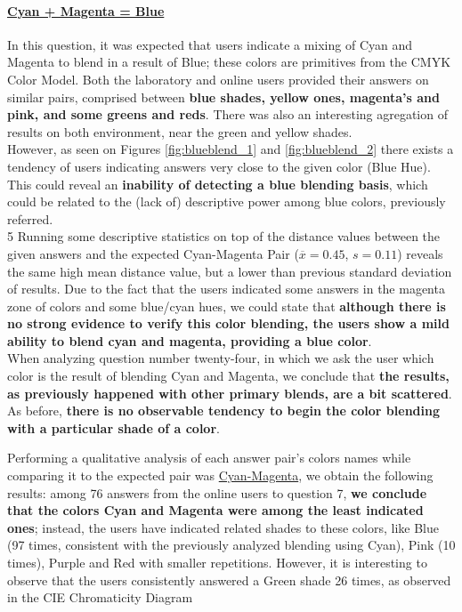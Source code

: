 \paragraph{\ul{Cyan + Magenta = Blue}}
%
In this question, it was expected that users indicate a mixing of Cyan and Magenta to blend in a result of Blue; these colors are primitives from the CMYK Color Model. Both the laboratory and online users provided their answers
on similar pairs, comprised between \textbf{blue shades, yellow ones, magenta's and pink, and some greens and reds}. There was also an interesting agregation of results on both environment, near the green and yellow shades.  \\
%
However, as seen on Figures \ref{fig:blueblend_1} and \ref{fig:blueblend_2} there exists a tendency of users indicating answers very close to the given color (Blue Hue). This could reveal an \textbf{inability of detecting a blue blending
basis}, which could be related to the (lack of) descriptive power among blue colors, previously referred. \\
5
Running some descriptive statistics on top of the distance values between the given answers and the expected Cyan-Magenta Pair ($\overline{x} = 0.45$, $s = 0.11$) reveals the same high mean distance value, but a lower than previous
standard deviation of results. Due to the fact that the users indicated some answers in the magenta zone of colors and some blue/cyan hues, we could state that \textbf{although there is no strong evidence to verify this color blending, the
users show a mild ability to blend cyan and magenta, providing a blue color}. \\
%
When analyzing question number twenty-four, in which we ask the user which color is the result of blending Cyan and Magenta, we conclude that \textbf{the results, as previously happened with other primary blends, are a bit scattered}.
As before, \textbf{there is no observable tendency to begin the color blending with a particular shade of a color}. \par
%
Performing a qualitative analysis of each answer pair's colors names while comparing it to the expected pair was
\ul{Cyan-Magenta}, we obtain the following results: among 76 answers from the online users to question 7, \textbf{we conclude
that the colors Cyan and Magenta were among the least indicated ones}; instead, the users have indicated related shades to these colors,
like Blue (97 times, consistent with the previously analyzed blending using Cyan), Pink (10 times), Purple and Red with smaller repetitions.
However, it is interesting to observe that the users consistently answered a Green shade 26 times, as observed in the CIE Chromaticity Diagram
